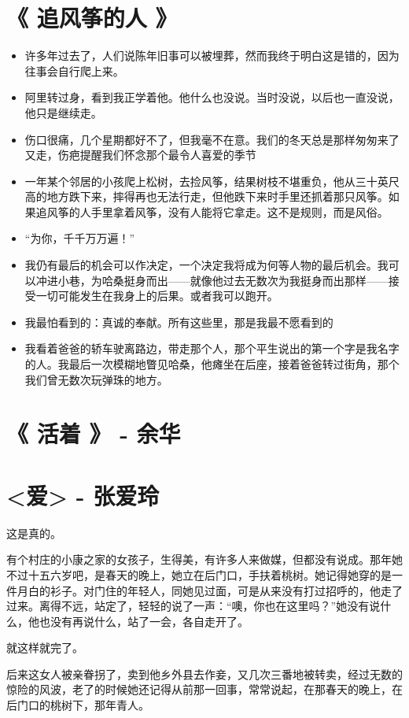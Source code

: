 \documentclass[UTF8,a4paper,8pt]{ctexbook}
\begin{document}
	\section{《 追风筝的人 》 } 
		\begin{itemize}
			\item 许多年过去了，人们说陈年旧事可以被埋葬，然而我终于明白这是错的，因为往事会自行爬上来。
			\item 阿里转过身，看到我正学着他。他什么也没说。当时没说，以后也一直没说，他只是继续走。
			\item 伤口很痛，几个星期都好不了，但我毫不在意。我们的冬天总是那样匆匆来了又走，伤疤提醒我们怀念那个最令人喜爱的季节
			\item 一年某个邻居的小孩爬上松树，去捡风筝，结果树枝不堪重负，他从三十英尺高的地方跌下来，摔得再也无法行走，但他跌下来时手里还抓着那只风筝。如果追风筝的人手里拿着风筝，没有人能将它拿走。这不是规则，而是风俗。
			\item “为你，千千万万遍！”
			\item 我仍有最后的机会可以作决定，一个决定我将成为何等人物的最后机会。我可以冲进小巷，为哈桑挺身而出——就像他过去无数次为我挺身而出那样——接受一切可能发生在我身上的后果。或者我可以跑开。
			\item 我最怕看到的：真诚的奉献。所有这些里，那是我最不愿看到的
			\item 我看着爸爸的轿车驶离路边，带走那个人，那个平生说出的第一个字是我名字的人。我最后一次模糊地瞥见哈桑，他瘫坐在后座，接着爸爸转过街角，那个我们曾无数次玩弹珠的地方。
		\end{itemize}
		\newpage			
	\section{《 活着 》 -  余华 } 
	
		\newpage
	\section{<爱> - 张爱玲}
		这是真的。
		
		有个村庄的小康之家的女孩子，生得美，有许多人来做媒，但都没有说成。那年她不过十五六岁吧，是春天的晚上，她立在后门口，手扶着桃树。她记得她穿的是一件月白的衫子。对门住的年轻人，同她见过面，可是从来没有打过招呼的，他走了过来。离得不远，站定了，轻轻的说了一声：“噢，你也在这里吗？”她没有说什么，他也没有再说什么，站了一会，各自走开了。
		
		就这样就完了。
		
		后来这女人被亲眷拐了，卖到他乡外县去作妾，又几次三番地被转卖，经过无数的惊险的风波，老了的时候她还记得从前那一回事，常常说起，在那春天的晚上，在后门口的桃树下，那年青人。
		
\end{document}
